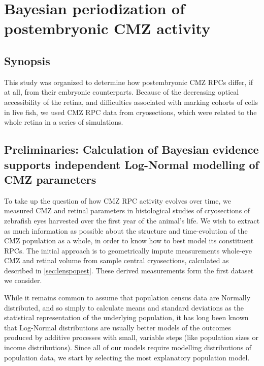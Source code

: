 \chapter{Bayesian periodization of postembryonic CMZ activity}
\label{chap:CMZ}
\section{Synopsis}
This study was organized to determine how postembryonic CMZ RPCs differ, if at all, from their embryonic counterparts. Because of the decreasing optical accessibility of the retina, and difficulties associated with marking cohorts of cells in live fish, we used CMZ RPC data from cryosections, which were related to the whole retina in a series of simulations. 

\section{Preliminaries: Calculation of Bayesian evidence supports independent Log-Normal modelling of CMZ parameters}
To take up the question of how CMZ RPC activity evolves over time, we measured CMZ and retinal parameters in histological studies of cryosections of zebrafish eyes harvested over the first year of the animal's life. We wish to extract as much information as possible about the structure and time-evolution of the CMZ population as a whole, in order to know how to best model its constituent RPCs. The initial approach is to geometrically impute measurements whole-eye CMZ and retinal volume from sample central cryosections, calculated as described in \autoref{sec:lenspopest}. These derived measurements form the first dataset we consider.

While it remains common to assume that population census data are Normally distributed, and so simply to calculate means and standard deviations as the statistical representation of the underlying population, it has long been known \cite{Heath1967} that Log-Normal distributions are usually better models of the outcomes produced by additive processes with small, variable steps (like population sizes or income distributions). Since all of our models require modelling distributions of population data, we start by selecting the most explanatory population model.

